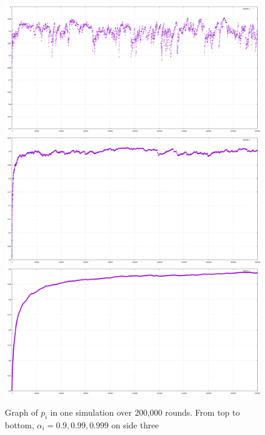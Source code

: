 \documentclass{article}
\begin{document}
\begin{figure}[htp]
\centering
\includegraphics[width=.8\textwidth]{images/ai9side3x200000}\hfill
\includegraphics[width=.8\textwidth]{images/ai99side3x200000}\hfill
\includegraphics[width=.8\textwidth]{images/ai999side3x200000}
\caption{Graph of $p_i$ in one simulation over 200,000 rounds. From top to bottom, $\alpha_i = 0.9, 0.99, 0.999$ on side three}
\label{fig:figure3}
\end{figure}
\end{document}

